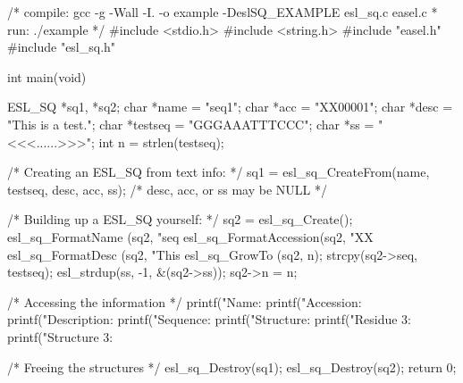 \begin{cchunk}
/* compile: gcc -g -Wall -I. -o example -DeslSQ_EXAMPLE esl_sq.c easel.c
 * run:     ./example
 */
#include <stdio.h>
#include <string.h>
#include "easel.h"
#include "esl_sq.h"

int main(void)
{
  ESL_SQ     *sq1, *sq2;
  char       *name    = "seq1";
  char       *acc     = "XX00001";
  char       *desc    = "This is a test.";
  char       *testseq = "GGGAAATTTCCC";
  char       *ss      = "<<<......>>>";
  int         n       = strlen(testseq);

  /* Creating an ESL_SQ from text info: */
  sq1 = esl_sq_CreateFrom(name, testseq, desc, acc, ss); /* desc, acc, or ss may be NULL */
  
  /* Building up a ESL_SQ yourself: */
  sq2 = esl_sq_Create();
  esl_sq_FormatName     (sq2, "seq%
  esl_sq_FormatAccession(sq2, "XX%
  esl_sq_FormatDesc     (sq2, "This %
  esl_sq_GrowTo         (sq2, n);
  strcpy(sq2->seq, testseq);
  esl_strdup(ss, -1, &(sq2->ss));  
  sq2->n = n;

  /* Accessing the information */
  printf("Name:        %
  printf("Accession:   %
  printf("Description: %
  printf("Sequence:    %
  printf("Structure:   %
  printf("Residue 3:   %
  printf("Structure 3: %
  
  /* Freeing the structures */
  esl_sq_Destroy(sq1);
  esl_sq_Destroy(sq2);
  return 0;
}
\end{cchunk}
